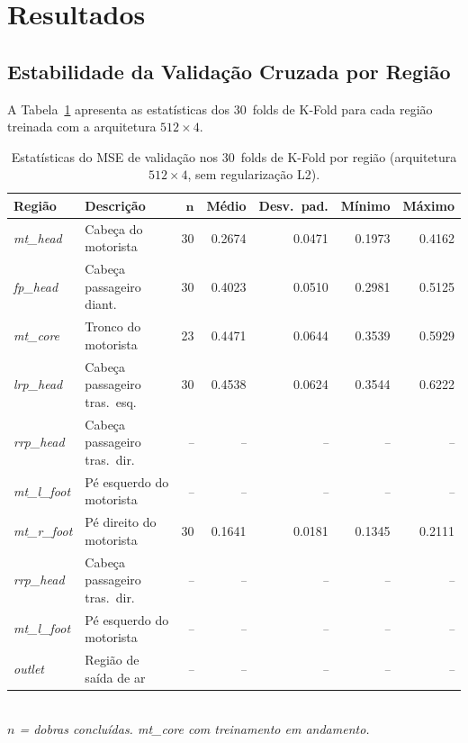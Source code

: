 \documentclass[12pt, a4paper]{article}
\newcommand{\andamento}{\textit{--}}
\begin{document}
\section{Resultados}
\label{sec:resultados}

\subsection{Estabilidade da Validação Cruzada por Região}
\label{sec:estabilidade}

A Tabela~\ref{tab:kfold_regioes} apresenta as estatísticas dos 30~folds de
K-Fold para cada região treinada com a arquitetura $512 \times 4$.

\begin{table}[htb]
\centering
\caption{%
  Estatísticas do MSE de validação nos 30~folds de K-Fold por região
  (arquitetura $512 \times 4$, sem regularização L2).
}
\label{tab:kfold_regioes}
\begin{tabular}{@{}llrrrrr@{}}
\toprule
\textbf{Região} & \textbf{Descrição} &
  $\boldsymbol{n}$ &
  \textbf{Médio} & \textbf{Desv.\ pad.} &
  \textbf{Mínimo} & \textbf{Máximo} \\
\midrule
\textit{mt\_head}  & Cabeça do motorista           & 30 & \num{0,2674} & \num{0,0471} & \num{0,1973} & \num{0,4162} \\
\textit{fp\_head}  & Cabeça passageiro diant.      & 30 & \num{0,4023} & \num{0,0510} & \num{0,2981} & \num{0,5125} \\
\textit{mt\_core}  & Tronco do motorista           & 23 & \num{0,4471} & \num{0,0644} & \num{0,3539} & \num{0,5929} \\
\textit{lrp\_head} & Cabeça passageiro tras.\ esq. & 30 & \num{0,4538} & \num{0,0624} & \num{0,3544} & \num{0,6222} \\
\midrule
\textit{rrp\_head}   & Cabeça passageiro tras.\ dir. & \andamento & \andamento & \andamento & \andamento & \andamento \\
\textit{mt\_l\_foot} & Pé esquerdo do motorista      & \andamento & \andamento & \andamento & \andamento & \andamento \\
\textit{mt\_r\_foot} & Pé direito do motorista       & 30 & \num{0,1641} & \num{0,0181} & \num{0,1345} & \num{0,2111} \\
\midrule
\textit{rrp\_head}   & Cabeça passageiro tras.\ dir. & \andamento & \andamento & \andamento & \andamento & \andamento \\
\textit{mt\_l\_foot} & Pé esquerdo do motorista      & \andamento & \andamento & \andamento & \andamento & \andamento \\
\textit{outlet}      & Região de saída de ar         & \andamento & \andamento & \andamento & \andamento & \andamento \\
\bottomrule
\end{tabular}
{\small\\\textit{$n$ = dobras concluídas. \textit{mt\_core} com treinamento em andamento.}}
\end{table}
\end{document}

